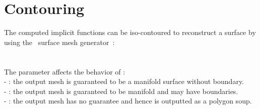\section{Contouring}

The computed implicit functions can be iso-contoured to reconstruct a surface by using the \cgal\ surface mesh generator~\cite{cgal:ry-gsddrm-06,cgal:bo-pgsms-05}: \\
 \\
\\
The parameter  affects the behavior of : \\
- : the output mesh is guaranteed to be a manifold surface without boundary.\\
- : the output mesh is guaranteed to be manifold and may have boundaries.\\
- : the output mesh has no guarantee and hence is outputted as a polygon soup.
